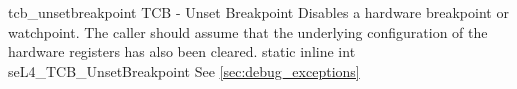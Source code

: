 %
%
%
%

\apidoc
{tcb_unsetbreakpoint}
{TCB - Unset Breakpoint}
{Disables a hardware breakpoint or watchpoint. The caller should assume that
the underlying configuration of the hardware registers has also been cleared.}
{static inline int seL4\_TCB\_UnsetBreakpoint}
{
}
{\errorenumdesc}
{See \autoref{sec:debug_exceptions}}
